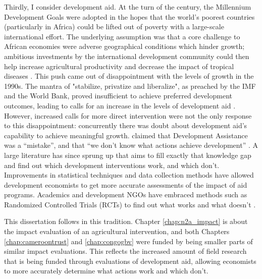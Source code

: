 Thirdly, I consider development aid. At the turn of the century, the Millennium Development Goals were adopted in the hopes that the world's poorest countries (particularly in Africa) could be lifted out of poverty with a large-scale international effort. The underlying assumption was that a core challenge to African economies were adverse geographical conditions which hinder growth; ambitious investments by the international development community could then help increase agricultural productivity and decrease the impact of tropical diseases \citep{Sachs2005}. This push came out of disappointment with the levels of growth in the 1990s. The mantra of "stabilize, privatize and liberalize", as preached by the IMF and the World Bank, proved insufficient to achieve preferred development outcomes, leading to calls  for an increase in the levels of development aid \citep{Rodrik2006a}. However, increased calls for more direct intervention were not the only response to this disappointment: concurrently there was doubt about development aid's capability to achieve meaningful growth. \citet{Easterly2007} claimed that Development Assistance was a ``mistake'', and that ``we don't know what actions achieve development'' . A large literature has since sprung up that aims to fill exactly that knowledge gap and find out which development interventions work, and which don't. Improvements in statistical techniques and data collection methods have allowed development economists to get more accurate assessments of the impact of aid programs. Academics and development NGOs have embraced methods such as Randomized Controlled Trials (RCTs) to find out what works and what doesn't \citep[see e.g.][]{Bannerjee2011}.  

This dissertation follows in this tradition. Chapter \ref{chap:n2a_impact} is about the impact evaluation of an agricultural intervention, and both Chapters \ref{chap:cameroontrust} and \ref{chap:congogbv} were funded by being smaller parts of similar impact evaluations. This reflects the increased amount of field research that is being funded through evaluations of development aid, allowing economists to more accurately determine what actions work and which don't.


